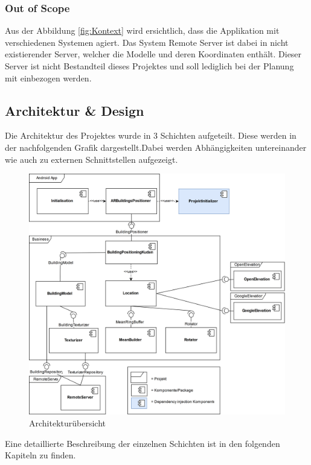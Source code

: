 \documentclass[a4paper]{scrreprt}
\begin{document}
\subsubsection{Out of Scope}
Aus der Abbildung \ref{fig:Kontext} wird ersichtlich, dass die Applikation mit verschiedenen Systemen agiert. Das System Remote Server ist dabei in nicht existierender Server, welcher die Modelle und deren Koordinaten enthält. Dieser Server ist nicht Bestandteil dieses Projektes und soll lediglich bei der Planung mit einbezogen werden.

\subsection{Architektur \& Design}
Die Architektur des Projektes wurde in 3 Schichten aufgeteilt. Diese werden in der nachfolgenden Grafik dargestellt.Dabei werden Abhängigkeiten untereinander wie auch zu externen Schnittstellen aufgezeigt.

\begin{figure}[h!]
	\includegraphics[keepaspectratio, width=\textwidth]{ArchitekturOverviewV0_4.png}
	\caption{Architekturübersicht}
\end{figure}

Eine detaillierte Beschreibung der einzelnen Schichten ist in den folgenden Kapiteln zu finden.
\end{document}
